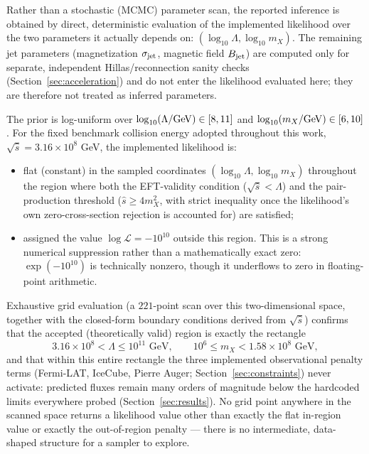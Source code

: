 \documentclass[twocolumn,superscriptaddress,prd,nofootinbib]{revtex4-2}
\begin{document}
Rather than a stochastic (MCMC) parameter scan, the reported inference is obtained by direct, deterministic evaluation of the implemented likelihood over the two parameters it actually depends on: $(\log_{10}\Lambda, \log_{10}m_X)$. The remaining jet parameters (magnetization $\sigma_{\rm jet}$, magnetic field $B_{\rm jet}$) are computed only for separate, independent Hillas/reconnection sanity checks (Section~\ref{sec:acceleration}) and do not enter the likelihood evaluated here; they are therefore not treated as inferred parameters.

The prior is log-uniform over $\log_{10}(\Lambda/{\rm GeV})\in[8,11]$ and $\log_{10}(m_X/{\rm GeV})\in[6,10]$. For the fixed benchmark collision energy adopted throughout this work, $\sqrt{\hat{s}} = 3.16\times10^8$ GeV, the implemented likelihood is:
\begin{itemize}
\item flat (constant) in the sampled coordinates $(\log_{10}\Lambda,\log_{10}m_X)$ throughout the region where both the EFT-validity condition ($\sqrt{\hat s}<\Lambda$) and the pair-production threshold ($\hat s\ge 4m_X^2$, with strict inequality once the likelihood's own zero-cross-section rejection is accounted for) are satisfied;
\item assigned the value $\log\mathcal{L}=-10^{10}$ outside this region. This is a strong numerical suppression rather than a mathematically exact zero: $\exp(-10^{10})$ is technically nonzero, though it underflows to zero in floating-point arithmetic.
\end{itemize}

Exhaustive grid evaluation (a $221$-point scan over this two-dimensional space, together with the closed-form boundary conditions derived from $\sqrt{\hat s}$) confirms that the accepted (theoretically valid) region is exactly the rectangle
\begin{equation}
3.16\times10^8 < \Lambda \le 10^{11}\text{ GeV}, \qquad 10^6 \le m_X < 1.58\times10^8\text{ GeV},
\label{eq:accepted_region}
\end{equation}
and that within this entire rectangle the three implemented observational penalty terms (Fermi-LAT, IceCube, Pierre Auger; Section~\ref{sec:constraints}) never activate: predicted fluxes remain many orders of magnitude below the hardcoded limits everywhere probed (Section~\ref{sec:results}). No grid point anywhere in the scanned space returns a likelihood value other than exactly the flat in-region value or exactly the out-of-region penalty --- there is no intermediate, data-shaped structure for a sampler to explore.
\end{document}
